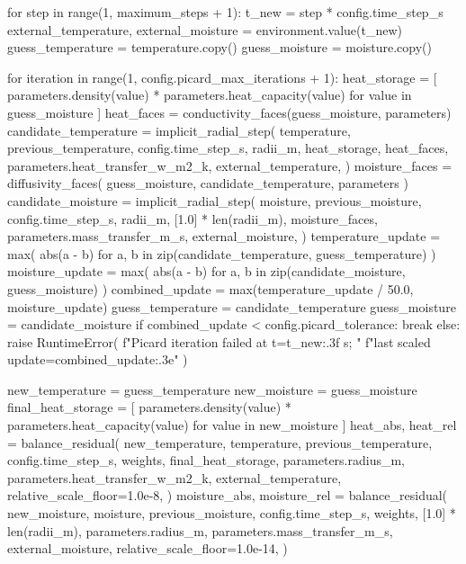 \documentclass[withoutpreface,bwprint]{cumcmthesis}
\begin{document}
\begin{PythonCode}
    for step in range(1, maximum_steps + 1):
        t_new = step * config.time_step_s
        external_temperature, external_moisture = environment.value(t_new)
        guess_temperature = temperature.copy()
        guess_moisture = moisture.copy()

        for iteration in range(1, config.picard_max_iterations + 1):
            heat_storage = [
                parameters.density(value) * parameters.heat_capacity(value)
                for value in guess_moisture
            ]
            heat_faces = conductivity_faces(guess_moisture, parameters)
            candidate_temperature = implicit_radial_step(
                temperature,
                previous_temperature,
                config.time_step_s,
                radii_m,
                heat_storage,
                heat_faces,
                parameters.heat_transfer_w_m2_k,
                external_temperature,
            )
            moisture_faces = diffusivity_faces(
                guess_moisture, candidate_temperature, parameters
            )
            candidate_moisture = implicit_radial_step(
                moisture,
                previous_moisture,
                config.time_step_s,
                radii_m,
                [1.0] * len(radii_m),
                moisture_faces,
                parameters.mass_transfer_m_s,
                external_moisture,
            )
            temperature_update = max(
                abs(a - b)
                for a, b in zip(candidate_temperature, guess_temperature)
            )
            moisture_update = max(
                abs(a - b) for a, b in zip(candidate_moisture, guess_moisture)
            )
            combined_update = max(temperature_update / 50.0, moisture_update)
            guess_temperature = candidate_temperature
            guess_moisture = candidate_moisture
            if combined_update < config.picard_tolerance:
                break
        else:
            raise RuntimeError(
                f"Picard iteration failed at t={t_new:.3f} s; "
                f"last scaled update={combined_update:.3e}"
            )

        new_temperature = guess_temperature
        new_moisture = guess_moisture
        final_heat_storage = [
            parameters.density(value) * parameters.heat_capacity(value)
            for value in new_moisture
        ]
        heat_abs, heat_rel = balance_residual(
            new_temperature,
            temperature,
            previous_temperature,
            config.time_step_s,
            weights,
            final_heat_storage,
            parameters.radius_m,
            parameters.heat_transfer_w_m2_k,
            external_temperature,
            relative_scale_floor=1.0e-8,
        )
        moisture_abs, moisture_rel = balance_residual(
            new_moisture,
            moisture,
            previous_moisture,
            config.time_step_s,
            weights,
            [1.0] * len(radii_m),
            parameters.radius_m,
            parameters.mass_transfer_m_s,
            external_moisture,
            relative_scale_floor=1.0e-14,
        )


\end{PythonCode}
\end{document}
